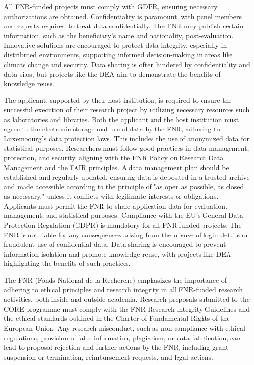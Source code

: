 \documentclass{article}
\begin{document}
All FNR-funded projects must comply with GDPR, ensuring necessary authorizations are obtained. Confidentiality is paramount, with panel members and experts required to treat data confidentially. The FNR may publish certain information, such as the beneficiary's name and nationality, post-evaluation. Innovative solutions are encouraged to protect data integrity, especially in distributed environments, supporting informed decision-making in areas like climate change and security. Data sharing is often hindered by confidentiality and data silos, but projects like the DEA aim to demonstrate the benefits of knowledge reuse.

The applicant, supported by their host institution, is required to ensure the successful execution of their research project by utilizing necessary resources such as laboratories and libraries. Both the applicant and the host institution must agree to the electronic storage and use of data by the FNR, adhering to Luxembourg's data protection laws. This includes the use of anonymized data for statistical purposes. Researchers must follow good practices in data management, protection, and security, aligning with the FNR Policy on Research Data Management and the FAIR principles. A data management plan should be established and regularly updated, ensuring data is deposited in a trusted archive and made accessible according to the principle of "as open as possible, as closed as necessary," unless it conflicts with legitimate interests or obligations. Applicants must permit the FNR to share application data for evaluation, management, and statistical purposes. Compliance with the EU’s General Data Protection Regulation (GDPR) is mandatory for all FNR-funded projects. The FNR is not liable for any consequences arising from the misuse of login details or fraudulent use of confidential data. Data sharing is encouraged to prevent information isolation and promote knowledge reuse, with projects like DEA highlighting the benefits of such practices.

The FNR (Fonds National de la Recherche) emphasizes the importance of adhering to ethical principles and research integrity in all FNR-funded research activities, both inside and outside academia. Research proposals submitted to the CORE programme must comply with the FNR Research Integrity Guidelines and the ethical standards outlined in the Charter of Fundamental Rights of the European Union. Any research misconduct, such as non-compliance with ethical regulations, provision of false information, plagiarism, or data falsification, can lead to proposal rejection and further actions by the FNR, including grant suspension or termination, reimbursement requests, and legal actions.
\end{document}
